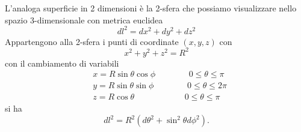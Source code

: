 L'analoga superficie in 2 dimensioni è la 2-sfera che possiamo visualizzare
nello spazio 3-dimensionale con metrica euclidea
\begin{equation}
  dl^2 = dx^2+dy^2+dz^2
\end{equation}
Appartengono alla 2-sfera i punti di coordinate $(x,y,z)$ con
\begin{equation}
  x^2+y^2+z^2=R^2
\end{equation}
con il cambiamento di variabili
\begin{equation}
  \begin{split}
    & x=R \sin \theta \cos \phi~~~~~~~~~~~~~~~~~~ 0\le \theta \le \pi \\
    & y=R \sin \theta \sin \phi~~~~~~~~~~~~~~~~~~0\le \theta \le 2 \pi \\
    & z=R \cos \theta~~~~~~~~~~~~~~~~~~~~~~~~~~~0\le \theta \le \pi
    \label{coord_sfer}
\end{split}
\end{equation}
si ha
\begin{equation}
dl^2 = R^2(d\theta^2 + \sin^2 \theta d\phi^2).
\end{equation}

